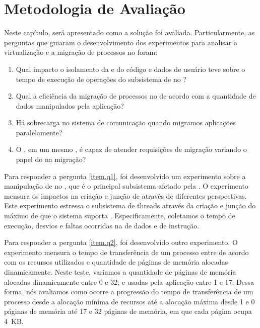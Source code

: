 \glsresetall
\chapter{Metodologia de Avaliação}
\label{chap.experiment-methodology}
Neste capítulo, será apresentado como a solução foi avaliada. Particularmente, as perguntas que guiaram o desenvolvimento dos experimentos para analisar a virtualização e a migração de processos no \nanvix foram:

\begin{enumerate}[start=1,label={Q\arabic*}]
    \item \label{item.q1}Qual impacto o isolamento da \uarea e do código e dados de usuário teve sobre o tempo de execução de operações do subsistema de \threads no \nanvix?
    \item \label{item.q2}Qual a eficiência da migração de processos no \nanvix de acordo com a quantidade de dados manipulados pela aplicação?
    \item \label{item.q3}Há sobrecarga no sistema de comunicação quando migramos aplicações paralelamente?
    \item \label{item.q4}O \daemon, em um mesmo \cluster, é capaz de atender requisições de migração variando o papel do \cluster na migração?
\end{enumerate}

Para responder a pergunta \ref{item.q1}, foi desenvolvido um experimento sobre a manipulação de \threads no \nanvix, que é o principal subsistema afetado pela \uarea. O experimento mensura os impactos na criação e junção de \threads através de diferentes perspectivas. Este experimento estressa o subsistema de threads através da criação e junção do máximo de \threads que o sistema suporta  \threads. Especificamente, coletamos o tempo de execução, desvios e faltas ocorridas na \cache de dados e de instrução.

Para responder a pergunta \ref{item.q2}, foi desenvolvido outro experimento. O experimento mensura o tempo de transferência de um processo entre \clusters de acordo com os recursos utilizados \ie \threads e quantidade de páginas de memória alocadas dinamicamente. Neste teste, variamos a quantidade de páginas de memória alocadas dinamicamente entre 0 e 32; e \threads usadas pela aplicação entre 1 e 17. Dessa forma, nós avaliamos como ocorre a progressão do tempo de transferência de um processo desde a alocação mínima de recursos até a alocação máxima \ie desde 1 \thread e 0 páginas de memória até 17 \threads e 32 páginas de memória, em que cada página ocupa 4~KB.

